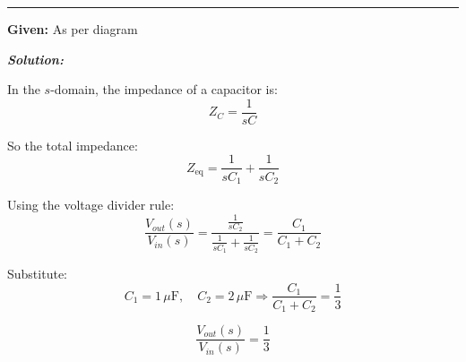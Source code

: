 \documentclass[11pt,letterpaper]{article}
\begin{document}
\noindent\rule{\textwidth}{1pt}

\noindent\textbf{Given:} As per diagram

\vspace{12pt}
\noindent\textit{\textbf{Solution:}}

\vspace{12pt}

In the \( s \)-domain, the impedance of a capacitor is:
\[
Z_C = \frac{1}{sC}
\]

So the total impedance:
\[
Z_{\text{eq}} = \frac{1}{sC_1} + \frac{1}{sC_2}
\]

Using the voltage divider rule:
\[
\frac{V_{out}(s)}{V_{in}(s)} = \frac{\frac{1}{sC_2}}{\frac{1}{sC_1} + \frac{1}{sC_2}} = \frac{C_1}{C_1 + C_2}
\]

Substitute:
\[
C_1 = 1\,\mu\text{F}, \quad C_2 = 2\,\mu\text{F} \Rightarrow \frac{C_1}{C_1 + C_2} = \frac{1}{3}
\]

\[
\boxed{\frac{V_{out}(s)}{V_{in}(s)} = \frac{1}{3}}
\]


\clearpage
\end{document}
